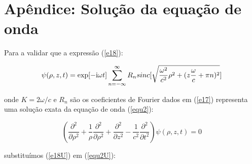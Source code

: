 \chapter{Apêndice: Solução da equação de onda}
\label{Cap:apA}

Para a validar que a expressão (\ref{e18}):

 \begin{equation}\label{e18U}
  \psi(\rho,z,t)= \exp[-{\rm i}\omega t]\sum\limits_{n=-\infty}^{\infty}R_n sinc[\sqrt{\frac{\omega^2}{c^2}\rho^2+(z\frac{\omega}{c}+\pi n)^2}]
\end{equation}

onde $K=2\omega/c$ e $R_n$ são os coeficientes de Fourier dados em (\ref{e17}) representa uma solução exata da equação de onda (\ref{equ2}):

 \begin{equation}\label{equ2U}
\left(\frac{\partial^2}{\partial {\rho}^2}  +  \frac{1}{\rho}\frac{\partial^2}{\partial {\rho}^2}  +    \frac{\partial^2}{\partial z^2}  -   \frac{1}{c^2}\frac{\partial^2}{\partial t^2}   \right)\psi(\rho,z, t) =0
\end{equation}

 substituímos (\ref{e18U}) em (\ref{equ2U}):


